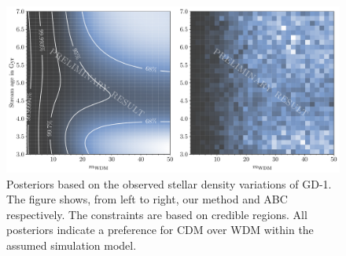 \documentclass{article}
\begin{document}
\begin{figure}[!b]
    \centering
    \includegraphics[width=.8\linewidth]{figures/posterior-gd1-all-2d}
    \caption{Posteriors based on the observed stellar density variations of GD-1.
    The figure shows, from left to right, our method and ABC respectively.
    The constraints are based on credible regions. All posteriors indicate a preference for CDM over WDM within the assumed simulation model.
    ~~\protect{}}
    \label{fig:gd1_posteriors}
\end{figure}
\end{document}
